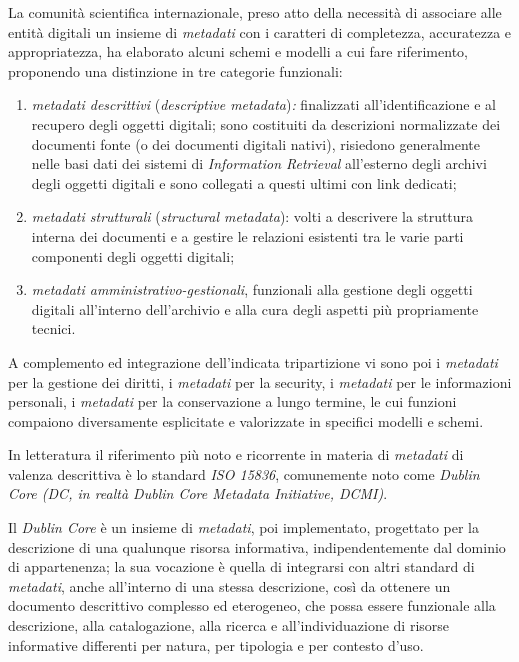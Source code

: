 {{La comunità scientifica internazionale, preso atto della necessità di
associare alle entità digitali un insieme di \emph{metadati} con i
caratteri di completezza, accuratezza e appropriatezza, ha elaborato
alcuni schemi e modelli a cui fare riferimento, proponendo una
distinzione in tre categorie funzionali:

\begin{enumerate}
\def\labelenumi{\arabic{enumi}.}
\item
  \emph{metadati descrittivi} (\emph{descriptive metadata})\emph{:}
  finalizzati all'identificazione e al recupero degli oggetti digitali;
  sono costituiti da descrizioni normalizzate dei documenti fonte (o dei
  documenti digitali nativi), risiedono generalmente nelle basi dati dei
  sistemi di \emph{Information Retrieval} all'esterno degli archivi
  degli oggetti digitali e sono collegati a questi ultimi con link
  dedicati;
\item
  \emph{metadati strutturali} (\emph{structural metadata}): volti a
  descrivere la struttura interna dei documenti e a gestire le relazioni
  esistenti tra le varie parti componenti degli oggetti digitali;
\item
  \emph{metadati amministrativo-gestionali}, funzionali alla gestione
  degli oggetti digitali all'interno dell'archivio e alla cura degli
  aspetti più propriamente tecnici.
\end{enumerate}

A complemento ed integrazione dell'indicata tripartizione vi sono poi i
\emph{metadati} per la gestione dei diritti, i \emph{metadati} per la
security, i \emph{metadati} per le informazioni personali, i
\emph{metadati} per la conservazione a lungo termine, le cui funzioni
compaiono diversamente esplicitate e valorizzate in specifici modelli e
schemi.

In letteratura il riferimento più noto e ricorrente in materia di
\emph{metadati} di valenza descrittiva è lo standard \emph{ISO 15836},
comunemente noto come \emph{Dublin Core (DC, in realtà Dublin Core
Metadata Initiative, DCMI)}.

Il \emph{Dublin Core} è un insieme di \emph{metadati}, poi implementato,
progettato per la descrizione di una qualunque risorsa informativa,
indipendentemente dal dominio di appartenenza; la sua vocazione è quella
di integrarsi con altri standard di \emph{metadati}, anche all'interno
di una stessa descrizione, così da ottenere un documento descrittivo
complesso ed eterogeneo, che possa essere funzionale alla descrizione,
alla catalogazione, alla ricerca e all'individuazione di risorse
informative differenti per natura, per tipologia e per contesto d'uso.

}}
